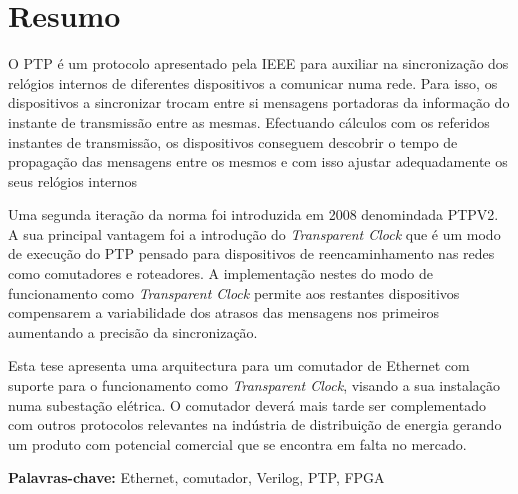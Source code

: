 
\section*{Resumo}


O PTP é um protocolo apresentado pela IEEE para auxiliar na sincronização dos relógios internos de diferentes dispositivos a comunicar numa rede. Para isso, os dispositivos a sincronizar trocam entre si mensagens portadoras da informação do instante de transmissão entre as mesmas. Efectuando cálculos com os referidos instantes de transmissão, os dispositivos conseguem descobrir o tempo de propagação das mensagens entre os mesmos e com isso ajustar adequadamente os seus relógios internos \par
Uma segunda iteração da norma foi introduzida em 2008 denomindada PTPV2. A sua principal vantagem foi a introdução do \textit{Transparent Clock} que é um modo de execução do PTP pensado para dispositivos de reencaminhamento nas redes como comutadores e roteadores. A implementação nestes do modo de funcionamento como \textit{Transparent Clock} permite aos restantes dispositivos compensarem a variabilidade dos atrasos das mensagens nos primeiros aumentando a precisão da sincronização. \par
Esta tese apresenta uma arquitectura para um comutador de Ethernet com suporte para o funcionamento como \textit{Transparent Clock}, visando a sua instalação numa subestação elétrica. O comutador deverá mais tarde ser complementado com outros protocolos relevantes na indústria de distribuição de energia gerando um produto com potencial comercial que se encontra em falta no mercado. 




\vfill

\textbf{\Large Palavras-chave:} Ethernet, comutador, Verilog, PTP, FPGA

